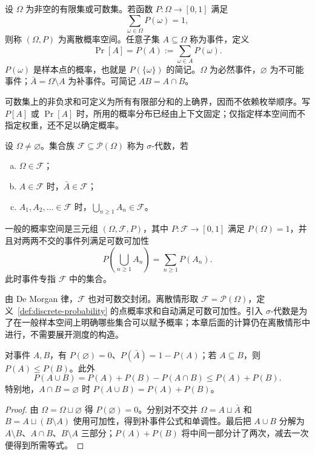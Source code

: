 \documentclass[lang=cn,a4paper,fontset=none,zihao=false,10pt,openany,twoside]{beautybook}
\numberwithin{algorithm}{chapter}
\newcommand{\Pow}{\mathcal P}
\begin{document}
\begin{definition}[离散概率空间]\label{def:discrete-probability}
设 $\Omega$ 为非空的有限集或可数集。若函数 $P:\Omega\to[0,1]$ 满足
\[
 \sum_{\omega\in\Omega}P(\omega)=1,
\]
则称 $(\Omega,P)$ 为离散概率空间。任意子集 $A\subseteq\Omega$ 称为事件，定义
\[
 \Pr[A]=P(A):=\sum_{\omega\in A}P(\omega).
\]
$P(\omega)$ 是样本点的概率，也就是 $P(\{\omega\})$ 的简记。$\Omega$ 为必然事件，$\varnothing$ 为不可能事件；$\bar{A}=\Omega\setminus A$ 为补事件。可简记 $AB=A\cap B$。
\end{definition}
可数集上的非负求和可定义为所有有限部分和的上确界，因而不依赖枚举顺序。写 $P[A]$ 或 $\Pr[A]$ 时，所用的概率分布已经由上下文固定；仅指定样本空间而不指定权重，还不足以确定概率。

\begin{definition}\label{def:sigma-probability}
设 $\Omega\ne\varnothing$。集合族 $\mathcal F\subseteq\Pow(\Omega)$ 称为 $\sigma$-代数，若
\begin{enumerate}[(a)]
\item $\Omega\in\mathcal F$；
\item $A\in\mathcal F$ 时，$\bar{A}\in\mathcal F$；
\item $A_1,A_2,\ldots\in\mathcal F$ 时，$\bigcup_{n\ge1}A_n\in\mathcal F$。
\end{enumerate}
一般的概率空间是三元组 $(\Omega,\mathcal F,P)$，其中 $P:\mathcal F\to[0,1]$ 满足 $P(\Omega)=1$，并且对两两不交的事件列满足可数可加性
\[
 P\left(\bigcup_{n\ge1}A_n\right)=\sum_{n\ge1}P(A_n).
\]
此时事件专指 $\mathcal F$ 中的集合。
\end{definition}
由 De Morgan 律，$\mathcal F$ 也对可数交封闭。离散情形取 $\mathcal F=\Pow(\Omega)$，定义~\ref{def:discrete-probability} 的点概率求和自动满足可数可加性。引入 $\sigma$-代数是为了在一般样本空间上明确哪些集合可以赋予概率；本章后面的计算仍在离散情形中进行，不需要展开测度的构造。

\begin{proposition}[概率的基本运算]\label{prop:probability-set-operations}
对事件 $A,B$，有 $P(\varnothing)=0$、$P(\bar{A})=1-P(A)$；若 $A\subseteq B$，则 $P(A)\le P(B)$。此外
\[
 P(A\cup B)=P(A)+P(B)-P(A\cap B)\le P(A)+P(B).
\]
特别地，$A\cap B=\varnothing$ 时 $P(A\cup B)=P(A)+P(B)$。
\end{proposition}
\begin{proof}
由 $\Omega=\Omega\sqcup\varnothing$ 得 $P(\varnothing)=0$。分别对不交并 $\Omega=A\sqcup \bar{A}$ 和 $B=A\sqcup(B\setminus A)$ 使用可加性，得到补事件公式和单调性。最后把 $A\cup B$ 分解为 $A\setminus B$、$A\cap B$、$B\setminus A$ 三部分；$P(A)+P(B)$ 将中间一部分计了两次，减去一次便得到所需等式。
\end{proof}
\end{document}
